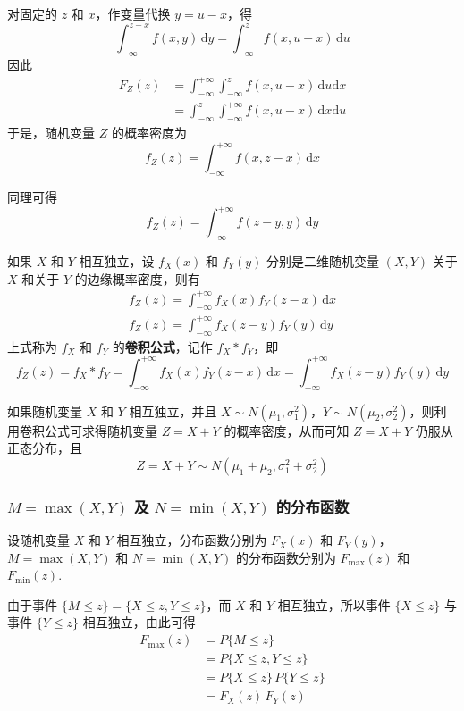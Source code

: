 对固定的 $z$ 和 $x$，作变量代换 $y=u-x$，得
$$
\int_{-\infty}^{z-x} f(x,y) \, \text{d}y = \int_{-\infty}^z f(x,u-x) \, \text{d}u
$$
因此
$$
\begin{aligned}
    F_{Z}(z) &= \int_{-\infty}^{+\infty} \int_{-\infty}^z f(x,u-x) \, \text{d}u \text{d}x \\
    &= \int_{-\infty}^z \int_{-\infty}^{+\infty} f(x,u-x) \, \text{d}x \text{d}u 
\end{aligned}
$$
于是，随机变量 $Z$ 的概率密度为
$$
f_{Z}(z) = \int_{-\infty}^{+\infty} f(x,z-x) \, \text{d}x
$$

同理可得
$$
f_{Z}(z) = \int_{-\infty}^{+\infty} f(z-y,y) \, \text{d}y
$$

如果 $X$ 和 $Y$ 相互独立，设 $f_{X}(x)$ 和 $f_{Y}(y)$ 分别是二维随机变量 $(X,Y)$ 关于 $X$ 和关于 $Y$ 的边缘概率密度，则有
\begin{gather*}
    f_{Z}(z) = \int_{-\infty}^{+\infty} f_{X}(x) f_{Y}(z-x) \, \text{d}x \\
    f_{Z}(z) = \int_{-\infty}^{+\infty} f_{X}(z-y) f_{Y}(y) \, \text{d}y
\end{gather*}
上式称为 $f_X$ 和 $f_Y$ 的\textbf{卷积公式}，记作 $f_X * f_Y$，即
\begin{equation}
    f_{Z}(z) = f_X * f_Y = \int_{-\infty}^{+\infty} f_{X}(x) f_{Y}(z-x) \, \text{d}x = \int_{-\infty}^{+\infty} f_{X}(z-y) f_{Y}(y) \, \text{d}y
\end{equation}

如果随机变量 $X$ 和 $Y$ 相互独立，并且 $X \sim N(\mu_1,\sigma_1^2)$，$Y \sim N(\mu_2,\sigma_2^2)$，则利用卷积公式可求得随机变量 $Z=X+Y$ 的概率密度，从而可知 $Z=X+Y$ 仍服从正态分布，且
$$
Z = X+Y \sim N(\mu_1 + \mu_2, \sigma_1^2 + \sigma_2^2)
$$

\subsubsection{$M = \max(X,Y)$ 及 $N = \min(X,Y)$ 的分布函数}

设随机变量 $X$ 和 $Y$ 相互独立，分布函数分别为 $F_{X}(x)$ 和 $F_{Y}(y)$，$M = \max(X,Y)$ 和 $N = \min(X,Y)$ 的分布函数分别为 $F_{\text{max}}(z)$ 和 $F_{\text{min}}(z)$.

由于事件 $\{M \leqslant z\} = \{X \leqslant z, Y \leqslant z\}$，而 $X$ 和 $Y$ 相互独立，所以事件 $\{X \leqslant z\}$ 与事件 $\{Y \leqslant z\}$ 相互独立，由此可得
$$
\begin{aligned}
    F_{\text{max}}(z) &= P\{M \leqslant z\} \\
    &= P\{X \leqslant z, Y \leqslant z\} \\
    &= P\{X \leqslant z\} \, P\{Y \leqslant z\} \\
    &= F_{X}(z) \, F_{Y}(z)
\end{aligned}
$$

